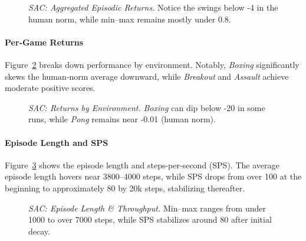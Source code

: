 \begin{figure}
	\centering
	\quad
	\caption{\emph{SAC: Aggregated Episodic Returns.} Notice the swings below -4 in the human norm, while min–max remains mostly under 0.8.}
	\label{fig:sac_returns_human_minmax}
\end{figure}

\paragraph{Per‐Game Returns}
Figure~\ref{fig:sac_returns_pergame} breaks down performance by environment. Notably, \emph{Boxing} significantly skews the human‐norm average downward, while \emph{Breakout} and \emph{Assault} achieve moderate positive scores.

\begin{figure}
	\centering
	\quad
	\caption{\emph{SAC: Returns by Environment.} \emph{Boxing} can dip below -20 in some runs, while \emph{Pong} remains near -0.01 (human norm).}
	\label{fig:sac_returns_pergame}
\end{figure}

\paragraph{Episode Length and SPS}
Figure~\ref{fig:sac_epilen_sps} shows the episode length and steps-per-second (SPS). The average episode length hovers near 3800–4000 steps, while SPS drops from over 100 at the beginning to approximately 80 by 20k steps, stabilizing thereafter.

\begin{figure}
	\centering
	\quad
	\caption{\emph{SAC: Episode Length \& Throughput.} Min–max ranges from under 1000 to over 7000 steps, while SPS stabilizes around 80 after initial decay.}
	\label{fig:sac_epilen_sps}
\end{figure}

